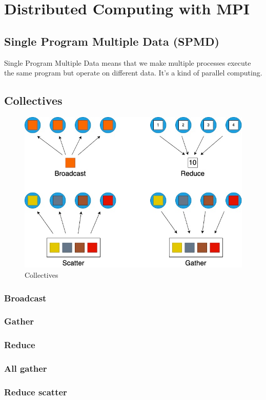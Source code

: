 \documentclass[12pt, openany]{report}
\theoremstyle{definition}
\begin{document}
\chapter{Distributed Computing with MPI}
\section{Single Program Multiple Data (SPMD)}
Single Program Multiple Data means that we make multiple processes execute the same program but operate on different data. It's a kind of parallel computing.
\section{Collectives}
\begin{figure}[H]
	\centering
	\includegraphics[scale=0.5]{img/collectives.jpeg}
	\caption{Collectives}
	\label{fig:collectives}
\end{figure}
\subsection{Broadcast}
\subsection{Gather}
\subsection{Reduce}
\subsection{All gather}
\subsection{Reduce scatter}
\end{document}
